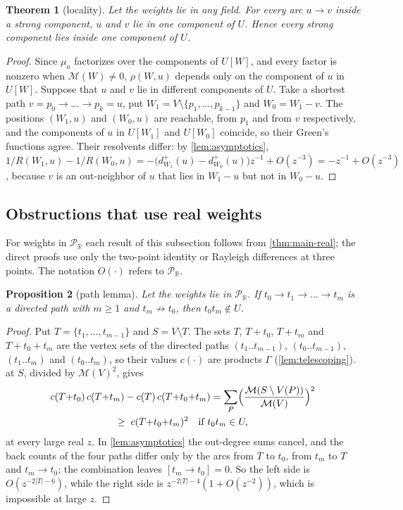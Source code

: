 \documentclass[11pt]{amsart}
\theoremstyle{plain}
\newtheorem{theorem}{Theorem}[section]
\newtheorem{proposition}[theorem]{Proposition}
\theoremstyle{definition}
\theoremstyle{remark}
\numberwithin{equation}{section}
\newcommand{\RR}{\mathbb{R}}
\newcommand{\Puis}{\mathcal{P}_{\RR}}
\newcommand{\Mpot}{\mathcal{M}}           %
\begin{document}
\begin{theorem}[locality]\label{thm:locality}
Let the weights lie in any field. For every arc $u\to v$ inside a strong component, $u$ and $v$ lie in one component of $U$. Hence every strong component lies inside one component of $U$.
\end{theorem}
\begin{proof}
Since $\mu_a$ factorizes over the components of $U[W]$, and every factor is nonzero when $\Mpot(W)\neq0$, $\rho(W,u)$ depends only on the component of $u$ in $U[W]$. Suppose that $u$ and $v$ lie in different components of $U$. Take a shortest path $v=p_0\to\dots\to p_k=u$, put $W_1=V\setminus\{p_1,\dots,p_{k-1}\}$ and $W_0=W_1-v$. The positions $(W_1,u)$ and $(W_0,u)$ are reachable, from $p_1$ and from $v$ respectively, and the components of $u$ in $U[W_1]$ and $U[W_0]$ coincide, so their Green's functions agree. Their resolvents differ: by \cref{lem:asymptotics}, $1/R(W_1,u)-1/R(W_0,u)=-\bigl(d^{+}_{W_1}(u)-d^{+}_{W_0}(u)\bigr)z^{-1}+O(z^{-3})=-z^{-1}+O(z^{-3})$, because $v$ is an out-neighbor of $u$ that lies in $W_1-u$ but not in $W_0-u$.
\end{proof}

\subsection{Obstructions that use real weights}
For weights in $\Puis$ each result of this subsection follows from \cref{thm:main-real}; the direct proofs use only the two-point identity or Rayleigh differences at three points. The notation $O(\cdot)$ refers to $\Puis$.

\begin{proposition}[path lemma]\label{prop:path-lemma}
Let the weights lie in $\Puis$. If $t_0\to t_1\to\dots\to t_m$ is a directed path with $m\ge1$ and $t_m\not\to t_0$, then $t_0t_m\notin U$.
\end{proposition}
\begin{proof}
Put $T=\{t_1,\dots,t_{m-1}\}$ and $S=V\setminus T$. The sets $T$, $T+t_0$, $T+t_m$ and $T+t_0+t_m$ are the vertex sets of the directed paths $(t_1..t_{m-1})$, $(t_0..t_{m-1})$, $(t_1..t_m)$ and $(t_0..t_m)$, so their values $c(\cdot)$ are products $\Gamma$ (\cref{lem:telescoping}).  at $S$, divided by $\Mpot(V)^2$, gives
\begin{multline*}
c(T{+}t_0)\,c(T{+}t_m)-c(T)\,c(T{+}t_0{+}t_m)=\sum_{P}\Bigl(\frac{\Mpot(S\setminus V(P))}{\Mpot(V)}\Bigr)^{2}\\
\ge\;c(T{+}t_0{+}t_m)^{2}\quad\text{if }t_0t_m\in U,
\end{multline*}
at every large real $z$. In \cref{lem:asymptotics} the out-degree sums cancel, and the back counts of the four paths differ only by the arcs from $T$ to $t_0$, from $t_m$ to $T$ and $t_m\to t_0$; the combination leaves $[t_m\to t_0]=0$. So the left side is $O(z^{-2|T|-6})$, while the right side is $z^{-2|T|-4}(1+O(z^{-2}))$, which is impossible at large $z$.
\end{proof}
\end{document}
